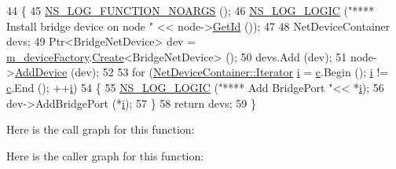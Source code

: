 \begin{DoxyCode}
44 \{
45   \hyperlink{log-macros-disabled_8h_a8f7e4afc291c9d29a65c18ac1f79197b}{NS\_LOG\_FUNCTION\_NOARGS} ();
46   \hyperlink{group__logging_ga88acd260151caf2db9c0fc84997f45ce}{NS\_LOG\_LOGIC} (\textcolor{stringliteral}{"**** Install bridge device on node "} << node->\hyperlink{classns3_1_1Node_aaf49b64a843565ce3812326313b370ac}{GetId} ());
47 
48   NetDeviceContainer devs;
49   Ptr<BridgeNetDevice> dev = \hyperlink{classns3_1_1BridgeHelper_a89ec6034749234a1388a0505eb9e683a}{m\_deviceFactory}.\hyperlink{classns3_1_1ObjectFactory_a18152e93f0a6fe184ed7300cb31e9896}{Create}<BridgeNetDevice> ();
50   devs.Add (dev);
51   node->\hyperlink{classns3_1_1Node_a42ff83ee1d5d1649c770d3f5b62375de}{AddDevice} (dev);
52 
53   \textcolor{keywordflow}{for} (\hyperlink{classns3_1_1NetDeviceContainer_a45709bb572f975569ed985fa89b132f8}{NetDeviceContainer::Iterator} \hyperlink{bernuolliDistribution_8m_a6f6ccfcf58b31cb6412107d9d5281426}{i} = \hyperlink{lte_2model_2fading-traces_2fading__trace__generator_8m_ae0323a9039add2978bf5b49550572c7c}{c}.Begin (); 
      \hyperlink{bernuolliDistribution_8m_a6f6ccfcf58b31cb6412107d9d5281426}{i} != \hyperlink{lte_2model_2fading-traces_2fading__trace__generator_8m_ae0323a9039add2978bf5b49550572c7c}{c}.End (); ++\hyperlink{bernuolliDistribution_8m_a6f6ccfcf58b31cb6412107d9d5281426}{i})
54     \{
55       \hyperlink{group__logging_ga88acd260151caf2db9c0fc84997f45ce}{NS\_LOG\_LOGIC} (\textcolor{stringliteral}{"**** Add BridgePort "}<< *\hyperlink{bernuolliDistribution_8m_a6f6ccfcf58b31cb6412107d9d5281426}{i});
56       dev->AddBridgePort (*\hyperlink{bernuolliDistribution_8m_a6f6ccfcf58b31cb6412107d9d5281426}{i});
57     \}
58   \textcolor{keywordflow}{return} devs;
59 \}
\end{DoxyCode}


Here is the call graph for this function\+:




Here is the caller graph for this function\+:


